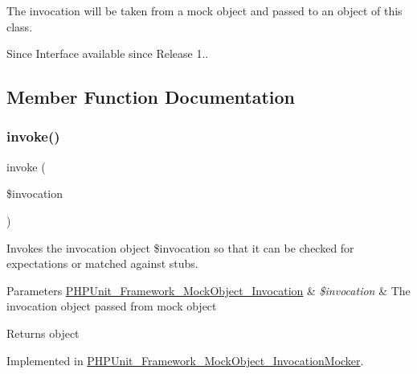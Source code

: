 The invocation will be taken from a mock object and passed to an object of this class.

\begin{DoxySince}{Since}
Interface available since Release 1.. 
\end{DoxySince}


\subsection{Member Function Documentation}
\mbox{\label{interface_p_h_p_unit___framework___mock_object___invokable_af2fc26e6704e08d95f2ea1d9c5ffb865}} 
\subsubsection{\texorpdfstring{invoke()}{invoke()}}
{\footnotesize\ttfamily invoke (\begin{DoxyParamCaption}\item[{\mbox{\hyperlink{interface_p_h_p_unit___framework___mock_object___invocation}{P\+H\+P\+Unit\+\_\+\+Framework\+\_\+\+Mock\+Object\+\_\+\+Invocation}}}]{\$invocation }\end{DoxyParamCaption})}

Invokes the invocation object \$invocation so that it can be checked for expectations or matched against stubs.


\begin{DoxyParams}[1]{Parameters}
\mbox{\hyperlink{interface_p_h_p_unit___framework___mock_object___invocation}{P\+H\+P\+Unit\+\_\+\+Framework\+\_\+\+Mock\+Object\+\_\+\+Invocation}} & {\em \$invocation} & The invocation object passed from mock object\\
\hline
\end{DoxyParams}
\begin{DoxyReturn}{Returns}
object 
\end{DoxyReturn}


Implemented in \mbox{\hyperlink{class_p_h_p_unit___framework___mock_object___invocation_mocker_af2fc26e6704e08d95f2ea1d9c5ffb865}{P\+H\+P\+Unit\+\_\+\+Framework\+\_\+\+Mock\+Object\+\_\+\+Invocation\+Mocker}}.

